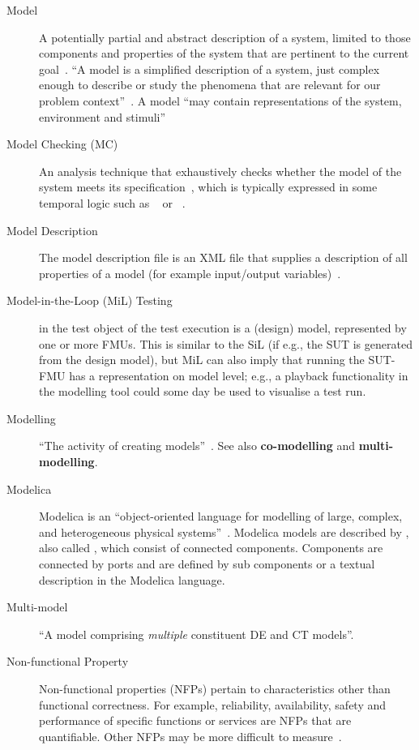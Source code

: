 \begin{description}
\item[Model] A potentially partial and abstract description of a system, limited to those components and properties of the system that are pertinent to the current goal~\cite{Holt&14}. ``A model is a simplified description of a system, just complex enough to describe or study the phenomena that are relevant for our problem context''~\cite{Amerongen10}. A model ``may contain representations of the system, environment and stimuli''~\cite{Fitzgerald&14c}

\item[Model Checking (MC)] An analysis technique that exhaustively checks whether the model of the system meets its specification~\cite{Clarke&99}, which is typically expressed in some temporal logic such as ~\cite{Pnueli77} or ~\cite{Clarke&81}.

\item[Model Description] The model description file is an XML file that supplies a description of all properties of a model (for example input/output variables)~\cite{FMIStandard2.0}.

\item[Model-in-the-Loop (MiL) Testing]  in  the test object of the test execution is a (design) model, represented by one or more FMUs. This is similar to the SiL (if e.g., the SUT is generated from the design model), but MiL can also imply that running the SUT-FMU has a representation on model level; e.g., a playback functionality in the modelling tool could some day be used to visualise a test run.

\item[Modelling] ``The activity of creating models''~\cite{Fitzgerald&14c}. See also \textbf{co-modelling} and \textbf{multi-modelling}.

\item[Modelica] Modelica is an ``object-oriented language for modelling of large, complex, and heterogeneous physical systems''~\cite{Fritzson&98}. Modelica models are described by , also called , which consist of connected components. Components are connected by ports and are defined by sub components or a textual description in the Modelica language.

\item[Multi-model] ``A model comprising \emph{multiple} constituent DE and CT models''.

\item[Non-functional Property] Non-functional properties (NFPs) pertain to characteristics other than functional correctness. For example, reliability, availability, safety and performance of specific functions or services are NFPs that are quantifiable. Other NFPs may be more difficult to measure~\cite{Payne&10}.


\end{description}
